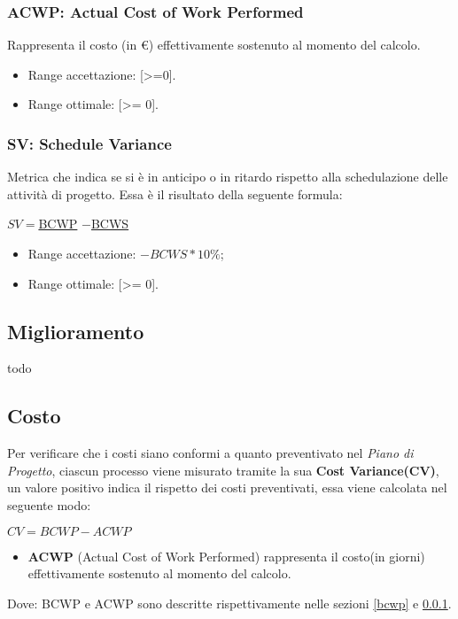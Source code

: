 \subsubsection{ACWP: Actual Cost of Work Performed}\label{acwp}
Rappresenta il costo (in \euro) effettivamente sostenuto al momento del calcolo.
\begin{itemize}
	\item Range accettazione: [>=0].
	\item Range ottimale: [>= 0].
\end{itemize}

\subsubsection{SV: Schedule Variance}
Metrica che indica se si è in anticipo o in ritardo rispetto alla schedulazione delle attività di progetto.
Essa è il risultato della seguente formula:\\
\begin{center}
	
	$SV = $\hyperref[bcwp]{BCWP} $-$\hyperref[bcws]{BCWS}
	
\end{center}

\begin{itemize}
	\item Range accettazione: $-BCWS *10\%$;
	\item Range ottimale: [>= 0].
\end{itemize}



\subsection{Miglioramento}
todo
\subsection{Costo}
Per verificare che i costi siano conformi a quanto preventivato nel \textit{Piano di Progetto}, ciascun processo viene misurato tramite la sua \textbf{Cost Variance(CV)}, un valore positivo indica il rispetto dei costi preventivati, essa viene calcolata nel seguente modo:\\ 

\begin{center}
	\begin{math}
	CV = BCWP - ACWP
	\end{math}
\end{center}
\begin{itemize}
	\item[] \textbf{ACWP} (Actual Cost of Work Performed) rappresenta il costo(in giorni) effettivamente sostenuto al momento del calcolo. 
\end{itemize}
Dove: BCWP e ACWP sono descritte rispettivamente nelle sezioni \ref{bcwp} e \ref{acwp}.

